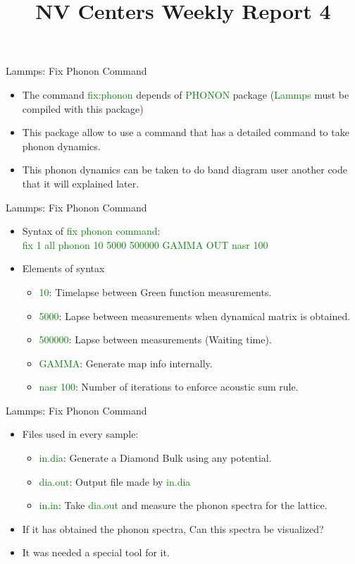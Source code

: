 \documentclass[11pt]{beamer}
\begin{document}
\title[NV-WR4]{NV Centers Weekly Report 4} 
\begin{frame}
\titlepage 
\end{frame}
\begin{frame}{Lammps: Fix Phonon Command}
  \begin{itemize}
    \item The command \textcolor{green}{fix:phonon} depends of \textcolor{green}{PHONON} package (\textcolor{green}{Lammps} must be compiled with this package)
    \item This package allow to use a command that has a detailed command to take phonon dynamics. 
    \item This phonon dynamics can be taken to do band diagram user another code that it will explained later.
 \end{itemize}
\end{frame}
\begin{frame}{Lammps: Fix Phonon Command}
  \begin{itemize}
    \item Syntax of \textcolor{green}{fix phonon command}:
    \\ \textcolor{green}{fix 1 all phonon 10 5000 500000 GAMMA OUT nasr 100}
    \item Elements of syntax
    \begin{itemize}
        \item \textcolor{green}{10}: Timelapse between Green function measurements.
        \item \textcolor{green}{5000}: Lapse between measurements when dynamical matrix is obtained.
        \item \textcolor{green}{500000}: Lapse between measurements (Waiting time).
        \item \textcolor{green}{GAMMA}: Generate map info internally.
        \item \textcolor{green}{nasr 100}: Number of iterations to enforce acoustic sum rule.
    \end{itemize}
 \end{itemize}
\end{frame}
\begin{frame}{Lammps: Fix Phonon Command}
  \begin{itemize}
    \item Files used in every sample:
    \begin{itemize}
        \item \textcolor{green}{in.dia}: Generate a Diamond Bulk using any potential.
        \item \textcolor{green}{dia.out}: Output file made by \textcolor{green}{in.dia}
        \item \textcolor{green}{in.in}: Take \textcolor{green}{dia.out} and measure the phonon spectra for the lattice.
    \end{itemize}
    \item If it has obtained the phonon spectra, Can this spectra be visualized?
    \item It was needed a special tool for it.
 \end{itemize}
\end{frame}
\end{document}
